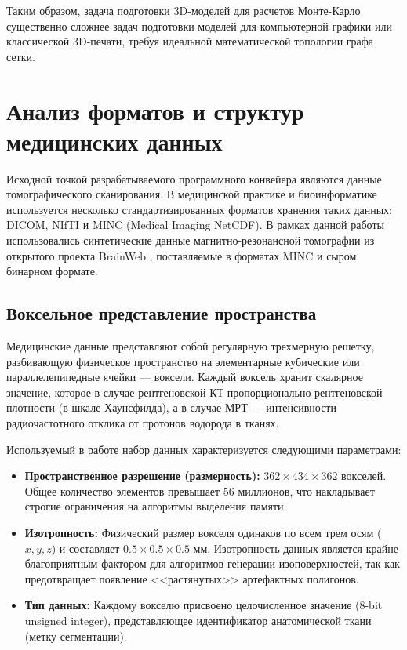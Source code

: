 \documentclass[a4paper,14pt]{article}
\begin{document}
Таким образом, задача подготовки 3D-моделей для расчетов Монте-Карло существенно сложнее задач подготовки моделей для компьютерной графики или классической 3D-печати, требуя идеальной математической топологии графа сетки.

\newpage
\section{Анализ форматов и структур медицинских данных}

Исходной точкой разрабатываемого программного конвейера являются данные томографического сканирования. В медицинской практике и биоинформатике используется несколько стандартизированных форматов хранения таких данных: DICOM, NIfTI и MINC (Medical Imaging NetCDF). В рамках данной работы использовались синтетические данные магнитно-резонансной томографии из открытого проекта BrainWeb \cite{collins1998}, поставляемые в форматах MINC и сыром бинарном формате.

\subsection{Воксельное представление пространства}
Медицинские данные представляют собой регулярную трехмерную решетку, разбивающую физическое пространство на элементарные кубические или параллелепипедные ячейки — воксели. Каждый воксель хранит скалярное значение, которое в случае рентгеновской КТ пропорционально рентгеновской плотности (в шкале Хаунсфилда), а в случае МРТ — интенсивности радиочастотного отклика от протонов водорода в тканях.

Используемый в работе набор данных характеризуется следующими параметрами:
\begin{itemize}
    \item \textbf{Пространственное разрешение (размерность):} $362 \times 434 \times 362$ вокселей. Общее количество элементов превышает 56 миллионов, что накладывает строгие ограничения на алгоритмы выделения памяти.
    \item \textbf{Изотропность:} Физический размер вокселя одинаков по всем трем осям ($x, y, z$) и составляет $0.5 \times 0.5 \times 0.5$ мм. Изотропность данных является крайне благоприятным фактором для алгоритмов генерации изоповерхностей, так как предотвращает появление <<растянутых>> артефактных полигонов.
    \item \textbf{Тип данных:} Каждому вокселю присвоено целочисленное значение (8-bit unsigned integer), представляющее идентификатор анатомической ткани (метку сегментации).
\end{itemize}
\end{document}
